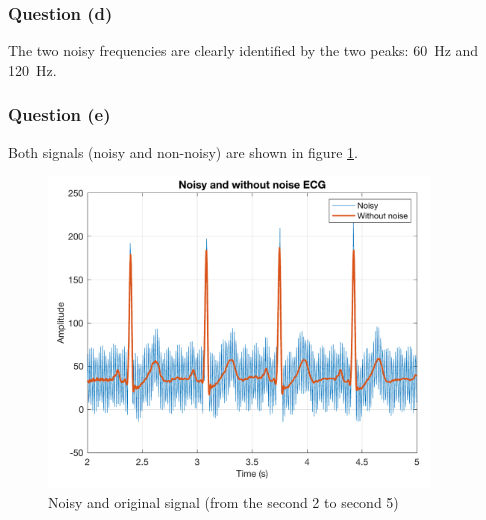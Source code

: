 \documentclass[a4paper, 12pt]{article}
\begin{document}
	\subsubsection*{Question (d)}
	The two noisy frequencies are clearly identified by the two peaks: \SI{60}{\hertz} and \SI{120}{\hertz}.
	\subsubsection*{Question (e)}
	Both signals (noisy and non-noisy) are shown in figure \ref{fig:plot_e}.
	\begin{figure}[H]
	    \centering
	    \includegraphics[width=0.9\textwidth]{resources/pdf/plot_e.pdf}
	    \caption{Noisy and original signal (from the second 2 to second 5)}
	    \label{fig:plot_e}
	\end{figure}
\end{document}
